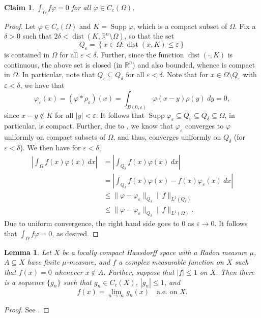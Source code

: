 \documentclass[10pt]{amsart}
\theoremstyle{thmstyle}
\newtheorem{lemma}[theorem]{Lemma}
\newtheorem*{claim}{Claim}
\theoremstyle{defstyle}
\newcommand{\R}{\mathbb{R}}
\newcommand{\Supp}{\operatorname{Supp}}
\renewcommand{\le}{\leqslant}
\newcommand{\dist}{\operatorname{dist}}
\begin{document}
\begin{claim}
	$\displaystyle\int_\Omega f\varphi = 0$ for all $\varphi\in C_c(\Omega)$.
\end{claim}
\begin{proof}
	Let $\varphi\in C_c(\Omega)$ and $K = \Supp\varphi$, which is a compact subset of $\Omega$. Fix a $\delta > 0$ such that $2\delta < \dist(K,\R^n\setminus\Omega)$, so that the set 
	\begin{equation*}
		Q_\varepsilon = \left\{x\in\Omega\colon\dist(x, K)\le\varepsilon\right\}
	\end{equation*}
	is contained in $\Omega$ for all $\varepsilon < \delta$. Further, since the function $\dist(\cdot, K)$ is continuous, the above set is closed (in $\R^n$) and also bounded, whence is compact in $\Omega$. In particular, note that $Q_\varepsilon\subseteq Q_\delta$ for all $\varepsilon < \delta$. Note that for $x\in\Omega\setminus Q_\varepsilon$ with $\varepsilon < \delta$, we have that 
	\begin{equation*}
		\varphi_\varepsilon(x) = (\varphi\ast\rho_\varepsilon)(x) = \int_{B(0,\varepsilon)} \varphi(x - y)\rho(y)~dy = 0,
	\end{equation*}
	since $x - y\notin K$ for all $|y| < \varepsilon$. It follows that $\Supp\varphi_\varepsilon\subseteq Q_\varepsilon\subseteq Q_\delta\subseteq\Omega$, in particular, is compact. Further, due to , we know that $\varphi_\varepsilon$ converges to $\varphi$ uniformly on compact subsets of $\Omega$, and thus, converges uniformly on $Q_\delta$ (for $\varepsilon < \delta$). We then have for $\varepsilon < \delta$,
	\begin{align*}
		\left|\int_\Omega f(x)\varphi(x)~dx\right| &= \left|\int_{Q_\delta} f(x)\varphi(x)~dx\right|\\
		&= \left|\int_{Q_\delta}f(x)\varphi(x) - f(x)\varphi_\varepsilon(x)~dx\right|\\
		&\le \|\varphi - \varphi_\varepsilon\|_{Q_\delta}\|f\|_{L^1(Q_\delta)}\\
		&\le \|\varphi - \varphi_\varepsilon\|_{Q_\delta}\|f\|_{L^1(\Omega)}.
	\end{align*}
	Due to uniform convergence, the right hand side goes to $0$ as $\varepsilon\to 0$. It follows that $\int_\Omega f\varphi = 0$, as desired.
\end{proof}

\begin{lemma}
	Let $X$ be a locally compact Hausdorff space with a Radon measure $\mu$, $A\subseteq X$ have finite $\mu$-measure, and $f$ a complex measurable function on $X$ such that $f(x) = 0$ whenever $x\notin A$. Further, suppose that $|f|\le 1$ on $X$. Then there is a sequence $\{g_n\}$ such that $g_n\in C_c(X)$, $|g_n|\le 1$, and 
	\begin{equation*}
		f(x) = \lim_{n\to\infty} g_n(x)\quad\text{a.e. on } X.
	\end{equation*}
\end{lemma}
\begin{proof}
	See \cite[Corollary to Theorem 2.24]{papa-rudin}.
\end{proof}
\end{document}
